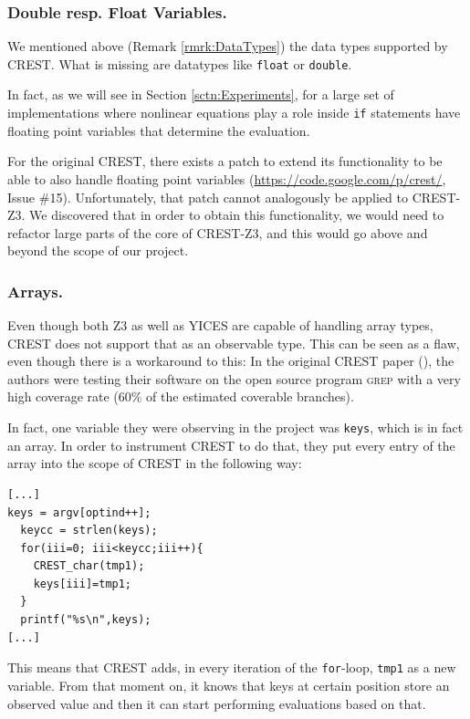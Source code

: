 \documentclass[oribibl, twocolumn]{llncs}
\begin{document}
\subsubsection{Double resp. Float Variables.}
\label{sbsbsctn:dblrespfloat}

We mentioned above (Remark \ref{rmrk:DataTypes}) the data types supported by \textsc{CREST}. What is
missing are datatypes like \texttt{float} or \texttt{double}.

In fact, as we will see in Section \ref{sctn:Experiments}, for a large set
of implementations where nonlinear equations play a role inside \texttt{if}
statements have floating point variables that determine the
evaluation.

For the original \textsc{CREST}, there exists a patch to extend its
functionality to be able to also handle floating point variables
(\url{https://code.google.com/p/crest/}, Issue \#15). Unfortunately, that
patch cannot analogously be applied to
\textsc{CREST-Z3}. We discovered that in order to obtain this functionality, we
would need to refactor large parts of the core of \textsc{CREST-Z3},
and this would go above and beyond the scope of our project.

\subsubsection{Arrays.}

Even though both \textsc{Z3} as well as \textsc{YICES} are capable of
handling array types, \textsc{CREST} does not support that as an
observable type. This can be seen as a flaw, even though there is a
workaround to this: In the original \textsc{CREST} paper
(\cite{CREST}), the authors were testing their software on the open
source program \textsc{grep} with a very high coverage rate (60\% of
the estimated coverable branches).

In fact, one variable they were observing in the project was \texttt{keys}, which is in fact an array. In order to
instrument \textsc{CREST} to do that, they put every entry of the
array into the scope of \textsc{CREST} in the following way:

\begin{verbatim}
[...]
keys = argv[optind++];
  keycc = strlen(keys);
  for(iii=0; iii<keycc;iii++){
    CREST_char(tmp1);
    keys[iii]=tmp1;
  }
  printf("%s\n",keys);
[...]
\end{verbatim}

This means that \textsc{CREST} adds, in every iteration of the
\texttt{for}-loop, \texttt{tmp1} as a new variable. From that moment on, it
knows that keys at certain position store an observed value and then
it can start performing evaluations based on that.
\end{document}
